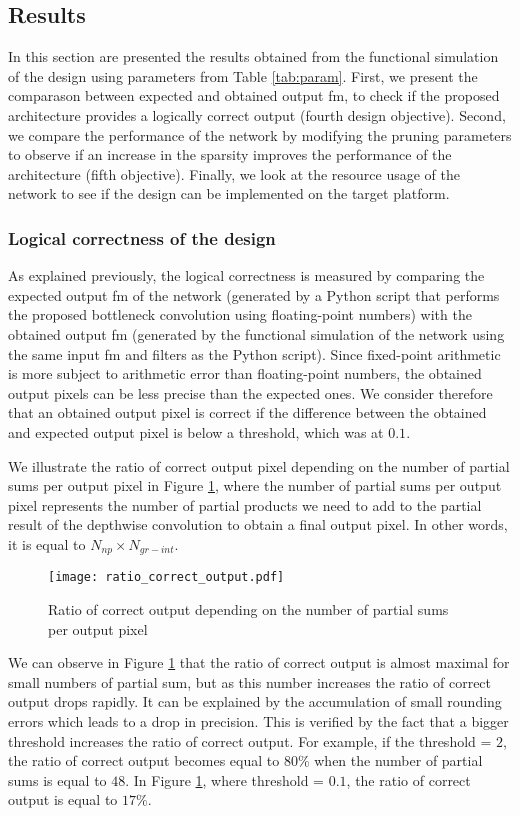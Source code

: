 \subsection{Results} \label{subs:res}
In this section are presented the results obtained from the functional simulation of the design using parameters from Table \ref{tab:param}. First, we present the comparason between expected and obtained output \acrshort{fm}, to check if the proposed architecture provides a logically correct output (fourth design objective). Second, we compare the performance of the network by modifying the pruning parameters to observe if an increase in the sparsity improves the performance of the architecture (fifth objective). Finally, we look at the resource usage of the network to see if the design can be implemented on the target platform.
%
\subsubsection{Logical correctness of the design}
%
As explained previously, the logical correctness is measured by comparing the expected output \acrshort{fm} of the network (generated by a Python script that performs the proposed bottleneck convolution using floating-point numbers) with the obtained output \acrshort{fm} (generated by the functional simulation of the network using the same input \acrshort{fm} and filters as the Python script). Since fixed-point arithmetic is more subject to arithmetic error than floating-point numbers, the obtained output pixels can be less precise than the expected ones. We consider therefore that an obtained output pixel is correct if the difference between the obtained and expected output pixel is below a threshold, which was at $0.1$.

We illustrate the ratio of correct output pixel depending on the number of partial sums per output pixel in Figure \ref{fig:res-output}, where the number of partial sums per output pixel represents the number of partial products we need to add to the partial result of the depthwise convolution to obtain a final output pixel. In other words, it is equal to $N_{np} \times N_{gr-int}$.
%
\begin{figure}[H]
    \centering
    \texttt{[image: ratio\_correct\_output.pdf]}
    \caption{Ratio of correct output depending on the number of partial sums per output pixel}
    \label{fig:res-output}
\end{figure}

We can observe in Figure \ref{fig:res-output} that the ratio of correct output is almost maximal for small numbers of partial sum, but as this number increases the ratio of correct output drops rapidly. It can be explained by the accumulation of small rounding errors which leads to a drop in precision. This is verified by the fact that a bigger threshold increases the ratio of correct output. For example, if the threshold = $2$, the ratio of correct output becomes equal to $80\%$ when the number of partial sums is equal to $48$. In Figure \ref{fig:res-output}, where threshold = $0.1$, the ratio of correct output is equal to $17\%$.
%
